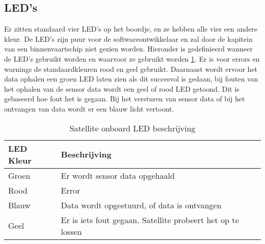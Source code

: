 \subsection{LED's}
Er zitten standaard vier LED’s op het boordje, en ze hebben alle vier een andere kleur. De LED’s zijn puur voor de softwareontwikkelaar en zal door de kapitein van een binnenvaartschip niet gezien worden. Hieronder is gedefinieerd wanneer de LED’s gebruikt worden en waarvoor ze gebruikt worden \ref{tab:leds}. Er is voor errors en warnings de standaardkleuren rood en geel gebruikt. Daarnaast wordt ervoor het data ophalen een groen LED laten zien als dit succesvol is gedaan, bij fouten van het ophalen van de sensor data wordt een geel of rood LED getoond. Dit is gebaseerd hoe fout het is gegaan. Bij het versturen van sensor data of bij het ontvangen van data wordt er een blauw licht vertoont.
\begin{table}[h!]
	\caption{Satellite onboard LED beschrijving}
	\begin{tabular}{lp{14.5cm}}
	\toprule
	\textbf{LED Kleur} 	& \textbf{Beschrijving} \\ \toprule
	Groen	& Er wordt sensor data opgehaald\\
	Rood	& Error \\
	Blauw	& Data wordt opgestuurd, of data is ontvangen \\
	Geel	& Er is iets fout gegaan, Satellite probeert het op te lossen\\  \bottomrule
	\end{tabular}
	\label{tab:leds}
\end{table}
